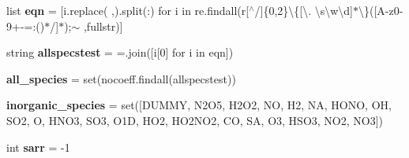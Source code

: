 \begin{DoxyCompactItemize}
list {\bfseries eqn} = \mbox{[}i.\+replace(\textquotesingle{} \textquotesingle{},\textquotesingle{}\textquotesingle{}).split(\textquotesingle{}\+:\textquotesingle{}) for i in re.\+findall(r\textquotesingle{}\mbox{[}$^\wedge$/\mbox{]}\{0,2\}\textbackslash{}\{\mbox{[}\textbackslash{}. \textbackslash{}s\textbackslash{}w\textbackslash{}d\mbox{]}$\ast$\textbackslash{}\}(\mbox{[}A-\/z0-\/9+-\/=\+:()$\ast$/\mbox{]}$\ast$);$\sim$\textquotesingle{} ,fullstr)\mbox{]}
\item 
\mbox{\label{namespaceMCM__subset__new_aa00372d41986e724154ed751c5380e53}} 
string {\bfseries allspecstest} = \textquotesingle{}=\textquotesingle{}.join(\mbox{[}i\mbox{[}0\mbox{]} for i in eqn\mbox{]})
\item 
\mbox{\label{namespaceMCM__subset__new_a6fcb5a271fba58bca7a411398fedf4ef}} 
{\bfseries all\+\_\+species} = set(nocoeff.\+findall(allspecstest))
\item 
\mbox{\label{namespaceMCM__subset__new_a338ac94aa449cccccf2b6aebf33edebd}} 
{\bfseries inorganic\+\_\+species} = set(\mbox{[}\textquotesingle{}D\+U\+M\+MY\textquotesingle{}, \textquotesingle{}N2\+O5\textquotesingle{}, \textquotesingle{}H2\+O2\textquotesingle{}, \textquotesingle{}NO\textquotesingle{}, \textquotesingle{}H2\textquotesingle{}, \textquotesingle{}NA\textquotesingle{}, \textquotesingle{}H\+O\+NO\textquotesingle{}, \textquotesingle{}OH\textquotesingle{}, \textquotesingle{}S\+O2\textquotesingle{}, \textquotesingle{}O\textquotesingle{}, \textquotesingle{}H\+N\+O3\textquotesingle{}, \textquotesingle{}S\+O3\textquotesingle{}, \textquotesingle{}O1D\textquotesingle{}, \textquotesingle{}H\+O2\textquotesingle{}, \textquotesingle{}H\+O2\+N\+O2\textquotesingle{}, \textquotesingle{}CO\textquotesingle{}, \textquotesingle{}SA\textquotesingle{}, \textquotesingle{}O3\textquotesingle{}, \textquotesingle{}H\+S\+O3\textquotesingle{}, \textquotesingle{}N\+O2\textquotesingle{}, \textquotesingle{}N\+O3\textquotesingle{}\mbox{]})
\item 
\mbox{\label{namespaceMCM__subset__new_a21dd9a52bca48efb9cfd813fadde11bb}} 
int {\bfseries sarr} = -\/1
\item 
\mbox{\label{namespaceMCM__subset__new_a69650c97c27ee8be5f74a437089065e0}} 

\end{DoxyCompactItemize}
